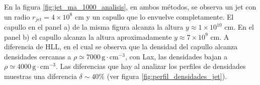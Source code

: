 \documentclass[12pt,a4paper]{book}
\begin{document}
En la figura \ref{fig:jet_ma_1000_analisis}, en ambos métodos, se observa un jet con un radio $r_{jet} = 4 \times 10^{8} $ cm y un capullo que lo envuelve completamente. El capullo en el panel a) de la misma figura alcanza la altura $y \approx 1 \times 10^{10}$ cm. En el panel b) el capullo alcanza la altura aproximadamente $y \approx 7 \times 10^{9}$ cm. A diferencia de HLL, en el cual se observa que la densidad del capullo alcanza densidades cercanas a $\rho \simeq 7000 \, \mathrm{g} \cdot \mathrm{cm}^{-3}$, con Lax, las densidades bajan a $\rho \simeq 4000 \, \mathrm{g} \cdot \mathrm{cm}^{-3}$. Las diferencias que hay al analizar los perfiles de densidades muestras una diferencia $\delta \sim 40\%$ (ver figura \ref{fig:perfil_densidades_jet}).
 

\begin{figure} 
\centering
{}

\end{figure}
\end{document}
